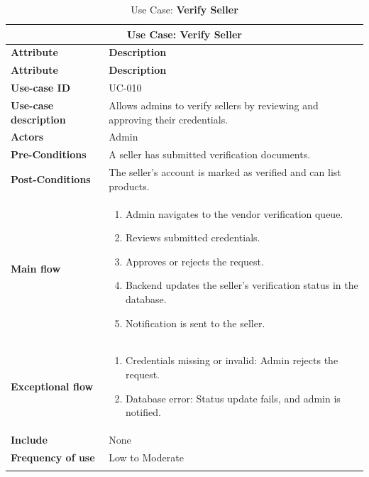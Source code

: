 \documentclass[12pt]{report}
\begin{document}
\begin{appendices}
	\begin{longtable}[H]{|l|p{9cm}||}
		\hline
		\multicolumn{2}{|c||}{\textbf{Use Case: Verify Seller}}                                                       \\
		\hline
		\textbf{Attribute}            & \textbf{Description}                                                          \\
		\hline
		\endfirsthead
		\hline
		\textbf{Attribute}            & \textbf{Description}                                                          \\
		\hline
		\endhead
		\textbf{Use-case ID}          & UC-010                                                                        \\
		\hline
		\textbf{Use-case description} & Allows admins to verify sellers by reviewing and approving their credentials. \\
		\hline
		\textbf{Actors}               & Admin                                                                         \\
		\hline
		\textbf{Pre-Conditions}       & A seller has submitted verification documents.                                \\
		\hline
		\textbf{Post-Conditions}      & The seller’s account is marked as verified and can list products.             \\
		\hline
		\textbf{Main flow}            & \begin{enumerate}
			                                \item Admin navigates to the vendor verification queue.
			                                \item Reviews submitted credentials.
			                                \item Approves or rejects the request.
			                                \item Backend updates the seller's verification status in the database.
			                                \item Notification is sent to the seller.
		                                \end{enumerate}        \\
		\hline
		\textbf{Exceptional flow}     & \begin{enumerate}
			                                \item Credentials missing or invalid: Admin rejects the request.
			                                \item Database error: Status update fails, and admin is notified.
		                                \end{enumerate}              \\
		\hline
		\textbf{Include}              & None                                                                          \\
		\hline
		\textbf{Frequency of use}     & Low to Moderate                                                               \\
		\hline
		\hline
		\caption{Use Case: \textbf{Verify Seller}}\label{tab:tableVerifySeller}
	\end{longtable}


\end{appendices}
\end{document}
